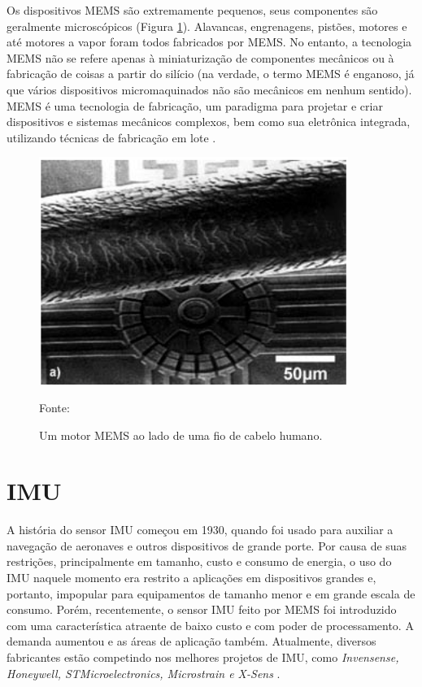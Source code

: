 		Os dispositivos MEMS são extremamente pequenos, seus componentes são geralmente microscópicos (Figura \ref{escala_mems}). Alavancas, engrenagens, pistões, motores e até motores a vapor foram todos fabricados por MEMS. No entanto, a tecnologia MEMS não se refere apenas à miniaturização de componentes mecânicos ou à fabricação de coisas a partir do silício (na verdade, o termo MEMS é enganoso, já que vários dispositivos micromaquinados não são mecânicos em nenhum sentido). MEMS é uma tecnologia de fabricação, um paradigma para projetar e criar dispositivos e sistemas mecânicos complexos, bem como sua eletrônica integrada, utilizando técnicas de fabricação em lote \cite{prime2002}.

		\begin{figure}[h!]
			\centering
			\includegraphics[keepaspectratio=true,scale=0.5
			]{figuras/escala_mems.png}
			\caption{Um motor MEMS ao lado de uma fio de cabelo humano.}
			Fonte: \cite{prime2002}
			\label{escala_mems}
		\end{figure}

	\section{IMU}

		A história do sensor IMU começou em 1930, quando foi usado para auxiliar a navegação de aeronaves e outros dispositivos de grande porte. Por causa de suas restrições, principalmente em tamanho, custo e consumo de energia, o uso do IMU naquele momento era restrito a aplicações em dispositivos grandes e, portanto, impopular para equipamentos de tamanho menor e em grande escala de consumo. Porém, recentemente, o sensor IMU feito por MEMS foi introduzido com uma característica atraente de baixo custo e com poder de processamento. A demanda aumentou e as áreas de aplicação também. Atualmente, diversos fabricantes estão competindo nos melhores projetos de IMU, como \textit{Invensense, Honeywell, STMicroelectronics, Microstrain e X-Sens} \cite{ahmad2013}.
		
